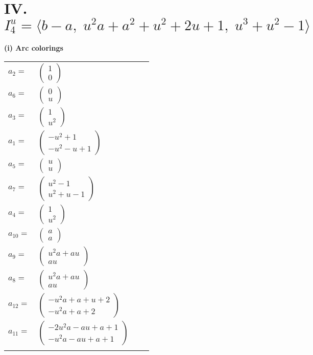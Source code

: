 \documentclass[1p]{elsarticle_modified}
\theoremstyle{definition}
\begin{document}
\centering \section*{IV. $I^u_{4}= \langle b- a,\;u^2 a+a^2+u^2+2 u+1,\;u^3+u^2-1 \rangle$}
\flushleft \textbf{(i) Arc colorings}\\
\begin{tabular}{m{7pt} m{180pt} m{7pt} m{180pt} }
\flushright $a_{2}=$&$\begin{pmatrix}1\\0\end{pmatrix}$ \\
\flushright $a_{6}=$&$\begin{pmatrix}0\\u\end{pmatrix}$ \\
\flushright $a_{3}=$&$\begin{pmatrix}1\\u^2\end{pmatrix}$ \\
\flushright $a_{1}=$&$\begin{pmatrix}- u^2+1\\- u^2- u+1\end{pmatrix}$ \\
\flushright $a_{5}=$&$\begin{pmatrix}u\\u\end{pmatrix}$ \\
\flushright $a_{7}=$&$\begin{pmatrix}u^2-1\\u^2+u-1\end{pmatrix}$ \\
\flushright $a_{4}=$&$\begin{pmatrix}1\\u^2\end{pmatrix}$ \\
\flushright $a_{10}=$&$\begin{pmatrix}a\\a\end{pmatrix}$ \\
\flushright $a_{9}=$&$\begin{pmatrix}u^2 a+a u\\a u\end{pmatrix}$ \\
\flushright $a_{8}=$&$\begin{pmatrix}u^2 a+a u\\a u\end{pmatrix}$ \\
\flushright $a_{12}=$&$\begin{pmatrix}- u^2 a+a+u+2\\- u^2 a+a+2\end{pmatrix}$ \\
\flushright $a_{11}=$&$\begin{pmatrix}-2 u^2 a- a u+a+1\\- u^2 a- a u+a+1\end{pmatrix}$\\&\end{tabular}
\end{document}
